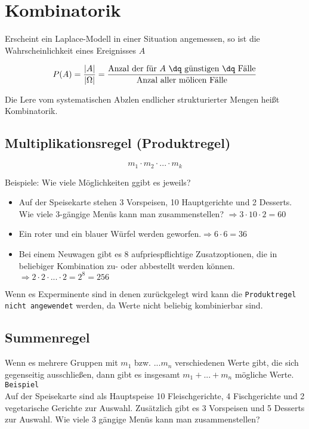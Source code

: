 \section{Kombinatorik}
Erscheint ein Laplace-Modell in einer Situation angemessen, so ist die Wahrscheinlichkeit eines Ereignisses $A$

\[P(A)= \frac{\left\lvert A\right\rvert }{\left\lvert \Omega \right\rvert }=\frac{\textrm{Anzal der für $A$ \dq günstigen \dq Fälle}}{\textrm{Anzal aller mölicen Fälle}} \]

Die Lere vom systematischen Abzlen endlicher \dq strukturierter \dq Mengen heißt Kombinatorik.

\subsection{Multiplikationsregel (Produktregel)}

\[m_1\cdot m_2 \cdot ... \cdot m_k\]

Beispiele: Wie viele Möglichkeiten ggibt es jeweils?\\

\begin{itemize}
    \item Auf der Speisekarte stehen 3 Vorspeisen, 10 Hauptgerichte und 2 Desserts. Wie viele 3-gängige Menüs kann man zusammenstellen? $\Longrightarrow 3\cdot 10\cdot 2 = 60$
    \item Ein roter und ein blauer Würfel werden geworfen.$\Longrightarrow 6\cdot 6=36$
    \item Bei einem Neuwagen gibt es 8 aufpriespflichtige Zusatzoptionen, die in beliebiger Kombination zu- oder abbestellt werden können.$\Longrightarrow 2\cdot 2\cdot ...\cdot 2 = 2^8=256$
\end{itemize}

Wenn es Experminente sind in denen zurückgelegt wird kann die \texttt{Produktregel nicht angewendet} werden, da Werte nicht beliebig kombinierbar sind.


\subsection{Summenregel}

Wenn es mehrere Gruppen mit $m_1$ bzw. $...m_n$ verschiedenen Werte gibt, die sich gegenseitig ausschließen, dann gibt es insgesamt $m_1+...+m_n$ mögliche Werte.\\

\texttt{Beispiel}\\
Auf der Speisekarte sind als Hauptspeise 10 Fleischgerichte, 4 Fischgerichte und 2 vegetarische Gerichte zur Auswahl. Zusätzlich gibt es 3 Vorspeisen und 5 Desserts zur Auswahl. Wie viele 3 gängige Menüs kann man zusammenstellen?

